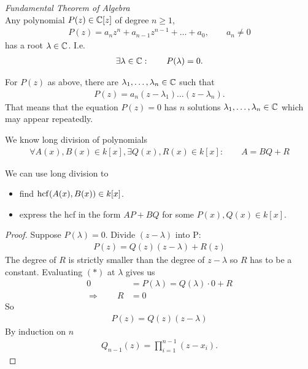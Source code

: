 \begin{tm}
	\emph{Fundamental Theorem of Algebra} \\
	Any polynomial $P(z) \in \mathbb C[z]$ of degree $n \ge 1$,
	\begin{align*}
	P(z) = a_n z^n + a_{n-1} z^{n-1} + \dots + a_0, \qquad a_n \neq 0
	\end{align*} 
	has a root $\lambda \in \mathbb C$. I.e.
	\begin{align*}
	\exists \lambda \in \mathbb C: \qquad P(\lambda) = 0.
	\end{align*}	
\end{tm}
 
\begin{pp}
	For $P(z)$ as above, there are $\lambda_1, \dots, \lambda_n \in \mathbb C$ such that
	\begin{align*}
	P(z) = a_n (z-\lambda_1) \dots (z-\lambda_n).
	\end{align*}
	That means that the equation $P(z)=0$ has $n$ solutions $\lambda_1, \dots, \lambda_n \in \mathbb C$ which may appear repeatedly.
\end{pp}

We know long division of polynomials
\begin{align*}
\forall A(x), B(x) \in k[x], \exists Q(x), R(x) \in k[x]: \qquad A=BQ+R
\end{align*}

\begin{rk}
	We can use long division to 
	\begin{itemize}
		\item 
		find $\operatorname{hcf}(A(x),B(x)) \in k[x]$.
		\item
		express the hcf in the form $AP+BQ$ for some $P(x), Q(x) \in k[x]$.
	\end{itemize}
\end{rk}

\begin{proof}
	Suppose $P(\lambda) = 0$. Divide $(z-\lambda)$ into P:
	\begin{align*}
	P(z) = Q(z)(z-\lambda) +R(z) \tag{$*$}
	\end{align*}
	The degree of $R$ is strictly smaller than the degree of $z-\lambda$ so $R$ has to be a constant. Evaluating $(*)$ at $\lambda$ gives us
	\begin{align*}
	0 & =P(\lambda) = Q(\lambda) \cdot 0 + R \\
	\Rightarrow \qquad R & =0
	\end{align*}
	So
	\begin{align*}
	P(z) = Q(z)(z-\lambda)
	\end{align*}
	By induction on $n$
	\begin{align*}
	Q_{n-1}(z) = \prod_{i=1}^{n-1} (z-x_i).
	\end{align*}
\end{proof}


